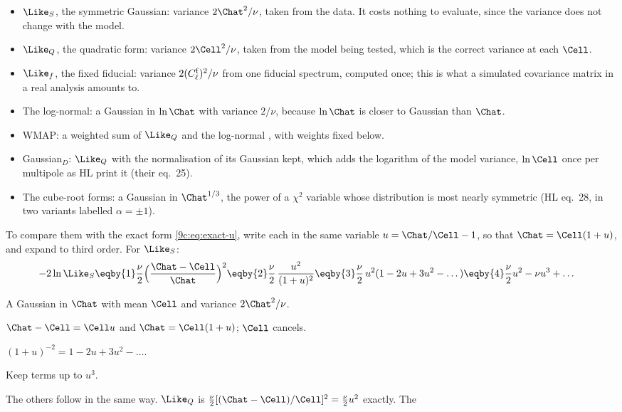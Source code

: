 \begin{itemize}[itemsep=1pt]
  \item $\Like_S$, the symmetric Gaussian: variance $2\Chat^2/\nu$, taken from the data. It costs nothing to
        evaluate, since the variance does not change with the model.
  \item $\Like_Q$, the quadratic form: variance $2\Cell^2/\nu$, taken from the model being tested, which is the
        correct variance at each $\Cell$.
  \item $\Like_f$, the fixed fiducial: variance $2(C^{\rm f}_\ell)^2/\nu$ from one fiducial spectrum, computed
        once; this is what a simulated covariance matrix in a real analysis amounts to.
  \item The log-normal: a Gaussian in $\ln\Chat$ with variance $2/\nu$, because $\ln\Chat$ is closer to Gaussian
        than $\Chat$.
  \item WMAP: a weighted sum of $\Like_Q$ and the log-normal \cite{Verde2003}, with weights fixed below.
  \item Gaussian$_D$: $\Like_Q$ with the normalisation of its Gaussian kept, which adds the logarithm of the
        model variance, $\ln\Cell$ once per multipole as HL print it (their eq.~25).
  \item The cube-root forms: a Gaussian in $\Chat^{1/3}$, the power of a $\chi^2$ variable whose distribution is
        most nearly symmetric (HL eq.~28, in two variants labelled $\alpha=\pm1$).
\end{itemize}
To compare them with the exact form \eqref{9c:eq:exact-u}, write each in the same variable
$u=\Chat/\Cell-1$, so that $\Chat=\Cell(1+u)$, and expand to third order. For $\Like_S$:
\begin{align}
  -2\ln\Like_S
  &\eqby{1}\frac\nu2\Bigl(\frac{\Chat-\Cell}{\Chat}\Bigr)^2
   \eqby{2}\frac\nu2\,\frac{u^2}{(1+u)^2}
   \eqby{3}\frac\nu2\,u^2(1-2u+3u^2-\dots)
   \eqby{4}\frac\nu2u^2-\nu u^3+\dots
  \label{9c:eq:LS-expand}
\end{align}
\begin{explain}
  \item A Gaussian in $\Chat$ with mean $\Cell$ and variance $2\Chat^2/\nu$.
  \item $\Chat-\Cell=\Cell u$ and $\Chat=\Cell(1+u)$; $\Cell$ cancels.
  \item $(1+u)^{-2}=1-2u+3u^2-\dots$.
  \item Keep terms up to $u^3$.
\end{explain}
The others follow in the same way. $\Like_Q$ is $\frac\nu2[(\Chat-\Cell)/\Cell]^2=\frac\nu2u^2$ exactly. The
